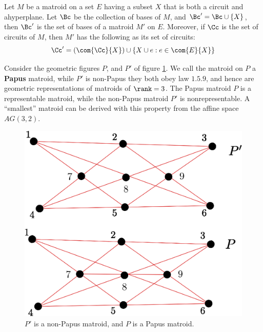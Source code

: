 \begin{theorem}\label{1.5.4}
    Let $M$ be a matroid on a set $E$ having a subset $X$ that is both a circuit
    and ahyperplane. Let $\Bc$ be the collection of bases of $M$, and  $\Bc'=\Bc
    \cup \{X\}$, then $\Bc'$ is the set of bases of a matroid $M'$ on $E$.
    Moreover, if $\Cc$ is the set of circuits of  $M$, then  $M'$ has the
    following as its set of circuits:
    \begin{equation*}
        \Cc'=(\com{\Cc}{X}) \cup \{X \cup e : e \in \com{E}{X}\}
    \end{equation*}
\end{theorem}

\begin{example}\label{1.20}
    Consider the geometric figures $P$, and $P'$ of figure \ref{fig_1.15}. We
    call the matroid on $P$ a  \textbf{Papus} matroid, while $P'$ is
    non-Papus they both obey law  $1.5.9$, and hence are geometric
    representations of  matroids of $\rank=3$. The Papus matroid $P$ is a
    representable matroid, while the non-Papus matroid  $P'$ is
    nonrepresentable. A ``smallest'' matroid can be derived with this property
    from the affine space $AG(3,2)$.
    \begin{figure}[h]
        \centering
        \includegraphics[scale=0.8]{Figures/Chapter1/paupus_nonpaupus.eps}
        \caption{$P'$ is a non-Papus matroid, and $P$ is a Papus matroid.}
        \label{fig_1.15}
    \end{figure}
\end{example}
